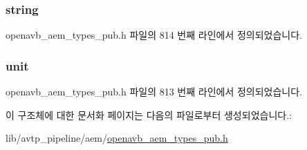 \subsubsection[{\texorpdfstring{string}{string}}]{ string}\hypertarget{structopenavb__aem__control__value__format__control__linear__int32__t_a1f81001cefa769cb3651172fd5ab0748}{}\label{structopenavb__aem__control__value__format__control__linear__int32__t_a1f81001cefa769cb3651172fd5ab0748}


openavb\+\_\+aem\+\_\+types\+\_\+pub.\+h 파일의 814 번째 라인에서 정의되었습니다.

\subsubsection[{\texorpdfstring{unit}{unit}}]{ unit}\hypertarget{structopenavb__aem__control__value__format__control__linear__int32__t_a0b3ff376c10369016824076deacc055e}{}\label{structopenavb__aem__control__value__format__control__linear__int32__t_a0b3ff376c10369016824076deacc055e}


openavb\+\_\+aem\+\_\+types\+\_\+pub.\+h 파일의 813 번째 라인에서 정의되었습니다.



이 구조체에 대한 문서화 페이지는 다음의 파일로부터 생성되었습니다.\+:\begin{DoxyCompactItemize}
\item 
lib/avtp\+\_\+pipeline/aem/\hyperlink{openavb__aem__types__pub_8h}{openavb\+\_\+aem\+\_\+types\+\_\+pub.\+h}\end{DoxyCompactItemize}
